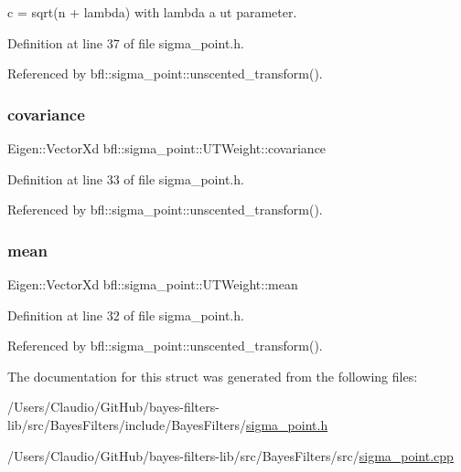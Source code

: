 c = sqrt(n + lambda) with lambda a ut parameter. 



Definition at line 37 of file sigma\+\_\+point.\+h.



Referenced by bfl\+::sigma\+\_\+point\+::unscented\+\_\+transform().

\mbox{\label{structbfl_1_1sigma__point_1_1UTWeight_a493c778f012c80ddd4049aa61d22514b}} 
\subsubsection{\texorpdfstring{covariance}{covariance}}
{\footnotesize\ttfamily Eigen\+::\+Vector\+Xd bfl\+::sigma\+\_\+point\+::\+U\+T\+Weight\+::covariance}



Definition at line 33 of file sigma\+\_\+point.\+h.



Referenced by bfl\+::sigma\+\_\+point\+::unscented\+\_\+transform().

\mbox{\label{structbfl_1_1sigma__point_1_1UTWeight_aa265298724b6547d123c7a96dec210b2}} 
\subsubsection{\texorpdfstring{mean}{mean}}
{\footnotesize\ttfamily Eigen\+::\+Vector\+Xd bfl\+::sigma\+\_\+point\+::\+U\+T\+Weight\+::mean}



Definition at line 32 of file sigma\+\_\+point.\+h.



Referenced by bfl\+::sigma\+\_\+point\+::unscented\+\_\+transform().



The documentation for this struct was generated from the following files\+:\begin{DoxyCompactItemize}
\item 
/\+Users/\+Claudio/\+Git\+Hub/bayes-\/filters-\/lib/src/\+Bayes\+Filters/include/\+Bayes\+Filters/\mbox{\hyperlink{sigma__point_8h}{sigma\+\_\+point.\+h}}\item 
/\+Users/\+Claudio/\+Git\+Hub/bayes-\/filters-\/lib/src/\+Bayes\+Filters/src/\mbox{\hyperlink{sigma__point_8cpp}{sigma\+\_\+point.\+cpp}}\end{DoxyCompactItemize}
